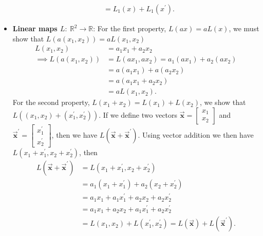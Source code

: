 \documentclass{report}
\begin{document}
\begin{itemize}
\begin{align*}
                &=L_{1}(x) + L_{1}(x^{\prime})
            .\end{align*}
        \item \textbf{Linear maps $L:\ \mathbb{R}^{2} \to \mathbb{R}$}: 
            \bigbreak \noindent 
            For the first property, $L(ax) = aL(x)$, we must show that $L(a(x_{1}, x_{2}))= aL(x_{1}, x_{2})$
            \begin{align*}
                L(x_{1}, x_{2}) &= a_{1}x_{1} + a_{2}x_{2} \\
                \implies L(a(x_{1}, x_{2})) &= L(ax_{1}, ax_{2}) = a_{1}(ax_{1}) + a_{2}(ax_{2}) \\
                                            &=a(a_{1}x_{1}) + a(a_{2}x_{2}) \\
                                            &=a(a_{1}x_{1} + a_{2}x_{2}) \\
                                            &=aL(x_{1}, x_{2})
            .\end{align*}
            \bigbreak \noindent 
            For the second property, $L(x_{1} + x_{2}) = L(x_{1}) + L(x_{2})$, we show that $L( (x_{1}, x_{2}) + (x^{\prime}_{1}, x^{\prime}_{2}))$. If we define two vectors $\vec{\mathbf{x}} = \begin{bmatrix} x_{1} \\ x_{2} \end{bmatrix} $ and $\vec{\mathbf{x}}^{\prime} = \begin{bmatrix} x^{\prime}_{1}\\ x^{\prime}_{2}\end{bmatrix}$, then we have $L(\vec{\mathbf{x}} + \vec{\mathbf{x}}^{\prime})$. Using vector addition we then have
            $L(x_{1} + x^{\prime}_{1}, x_{2} + x^{\prime}_{2})$, then
            \begin{align*}
                L(\vec{\mathbf{x}} + \vec{\mathbf{x}}^{\prime}) &= L(x_{1} + x^{\prime}_{1}, x_{2} + x^{\prime}_{2}) \\
                &=a_{1}(x_{1} + x^{\prime}_{1}) + a_{2}(x_{2} + x^{\prime}_{2}) \\
                &=a_{1}x_{1} + a_{1}x^{\prime}_{1} +a_{2}x_{2} + a_{2}x^{\prime}_{2} \\
                &=a_{1}x_{1} + a_{2}x_{2} + a_{1}x^{\prime}_{1} + a_{2}x^{\prime}_{2} \\
                &=L(x_{1}, x_{2}) + L(x^{\prime}_{1}, x^{\prime}_{2}) = L(\vec{\mathbf{x}}) + L(\vec{\mathbf{x}}^{\prime})
            .\end{align*}

\end{itemize}
\end{document}
